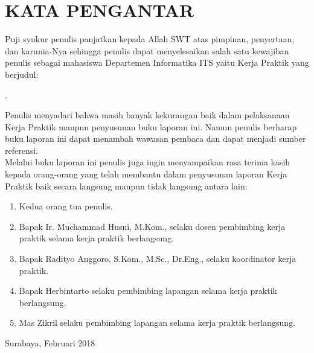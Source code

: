 \chapter{KATA PENGANTAR}

\indent\indent	Puji syukur penulis panjatkan kepada Allah SWT atas pimpinan, penyertaan, dan karunia-Nya sehingga penulis dapat menyelesaikan salah satu kewajiban penulis sebagai mahasiswa Departemen Informatika ITS yaitu Kerja Praktik yang berjudul:
\begin{center}
	\textbf{\MakeUppercase{\judul}}.
\end{center}

\indent Penulis menyadari bahwa masih banyak kekurangan baik dalam pelaksanaan Kerja Praktik maupun penyusunan buku laporan ini. Namun penulis berharap buku laporan ini dapat menambah wawasan pembaca dan dapat menjadi sumber referensi.\\
\indent Melalui buku laporan ini penulis juga ingin menyampaikan rasa terima kasih kepada orang-orang yang telah membantu dalam penyusunan laporan Kerja Praktik baik secara langsung maupun tidak langsung antara lain:
\begin{enumerate}
\item Kedua orang tua penulis.
\item Bapak Ir. Muchammad Husni, M.Kom., selaku dosen pembimbing kerja praktik selama kerja praktik berlangsung.
\item Bapak Radityo Anggoro, S.Kom., M.Sc., Dr.Eng., selaku koordinator kerja praktik.
\item Bapak Herbintarto selaku pembimbing lapangan selama kerja praktik berlangsung.
\item Mas Zikril selaku pembimbing lapangan selama kerja praktik berlangsung.\\
\end{enumerate}

\hfill Surabaya, Februari 2018 \\ \\
\begin{flushright}
\hfill{\penulis} \\
\hfill{\penulisDua}
\end{flushright}
\cleardoublepage
